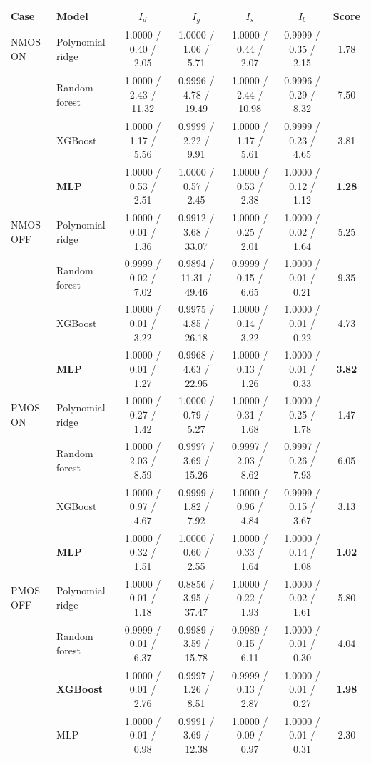 \documentclass[10pt]{article}
\begin{document}
{\footnotesize
\setlength{\tabcolsep}{2.5pt}
\begin{longtable}{@{}llccccc@{}}
\toprule
Case & Model & $I_d$ & $I_g$ & $I_s$ & $I_b$ & Score \\
\midrule
\endhead
NMOS ON & Polynomial ridge & 1.0000 / 0.40 / 2.05 & 1.0000 / 1.06 / 5.71 & 1.0000 / 0.44 / 2.07 & 0.9999 / 0.35 / 2.15 & 1.78 \\
 & Random forest & 1.0000 / 2.43 / 11.32 & 0.9996 / 4.78 / 19.49 & 1.0000 / 2.44 / 10.98 & 0.9996 / 0.29 / 8.32 & 7.50 \\
 & XGBoost & 1.0000 / 1.17 / 5.56 & 0.9999 / 2.22 / 9.91 & 1.0000 / 1.17 / 5.61 & 0.9999 / 0.23 / 4.65 & 3.81 \\
 & \textbf{MLP} & 1.0000 / 0.53 / 2.51 & 1.0000 / 0.57 / 2.45 & 1.0000 / 0.53 / 2.38 & 1.0000 / 0.12 / 1.12 & \textbf{1.28} \\
\midrule
NMOS OFF & Polynomial ridge & 1.0000 / 0.01 / 1.36 & 0.9912 / 3.68 / 33.07 & 1.0000 / 0.25 / 2.01 & 1.0000 / 0.02 / 1.64 & 5.25 \\
 & Random forest & 0.9999 / 0.02 / 7.02 & 0.9894 / 11.31 / 49.46 & 0.9999 / 0.15 / 6.65 & 1.0000 / 0.01 / 0.21 & 9.35 \\
 & XGBoost & 1.0000 / 0.01 / 3.22 & 0.9975 / 4.85 / 26.18 & 1.0000 / 0.14 / 3.22 & 1.0000 / 0.01 / 0.22 & 4.73 \\
 & \textbf{MLP} & 1.0000 / 0.01 / 1.27 & 0.9968 / 4.63 / 22.95 & 1.0000 / 0.13 / 1.26 & 1.0000 / 0.01 / 0.33 & \textbf{3.82} \\
\midrule
PMOS ON & Polynomial ridge & 1.0000 / 0.27 / 1.42 & 1.0000 / 0.79 / 5.27 & 1.0000 / 0.31 / 1.68 & 1.0000 / 0.25 / 1.78 & 1.47 \\
 & Random forest & 1.0000 / 2.03 / 8.59 & 0.9997 / 3.69 / 15.26 & 0.9997 / 2.03 / 8.62 & 0.9997 / 0.26 / 7.93 & 6.05 \\
 & XGBoost & 1.0000 / 0.97 / 4.67 & 0.9999 / 1.82 / 7.92 & 1.0000 / 0.96 / 4.84 & 0.9999 / 0.15 / 3.67 & 3.13 \\
 & \textbf{MLP} & 1.0000 / 0.32 / 1.51 & 1.0000 / 0.60 / 2.55 & 1.0000 / 0.33 / 1.64 & 1.0000 / 0.14 / 1.08 & \textbf{1.02} \\
\midrule
PMOS OFF & Polynomial ridge & 1.0000 / 0.01 / 1.18 & 0.8856 / 3.95 / 37.47 & 1.0000 / 0.22 / 1.93 & 1.0000 / 0.02 / 1.61 & 5.80 \\
 & Random forest & 0.9999 / 0.01 / 6.37 & 0.9989 / 3.59 / 15.78 & 0.9989 / 0.15 / 6.11 & 1.0000 / 0.01 / 0.30 & 4.04 \\
 & \textbf{XGBoost} & 1.0000 / 0.01 / 2.76 & 0.9997 / 1.26 / 8.51 & 0.9999 / 0.13 / 2.87 & 1.0000 / 0.01 / 0.27 & \textbf{1.98} \\
 & MLP & 1.0000 / 0.01 / 0.98 & 0.9991 / 3.69 / 12.38 & 1.0000 / 0.09 / 0.97 & 1.0000 / 0.01 / 0.31 & 2.30 \\
\bottomrule
\end{longtable}
}
\end{document}
